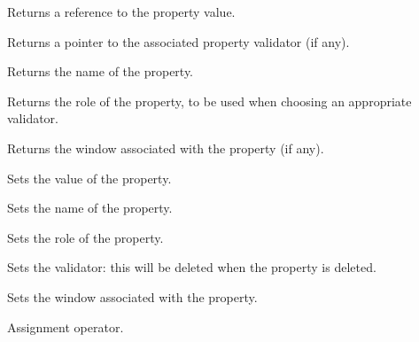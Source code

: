 

Returns a reference to the property value.



Returns a pointer to the associated property validator (if any).



Returns the name of the property.



Returns the role of the property, to be used when choosing an appropriate validator.



Returns the window associated with the property (if any).



Sets the value of the property.



Sets the name of the property.



Sets the role  of the property.



Sets the validator: this will be deleted when the property is deleted.



Sets the window associated with the property.



Assignment operator.

